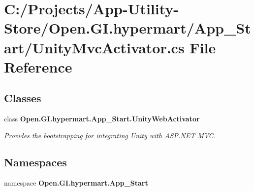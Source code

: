 \section{C\+:/\+Projects/\+App-\/\+Utility-\/\+Store/\+Open.G\+I.\+hypermart/\+App\+\_\+\+Start/\+Unity\+Mvc\+Activator.cs File Reference}
\label{_unity_mvc_activator_8cs}
\subsection*{Classes}
\begin{DoxyCompactItemize}
\item 
class {\bfseries Open.\+G\+I.\+hypermart.\+App\+\_\+\+Start.\+Unity\+Web\+Activator}
\begin{DoxyCompactList}\small\item\em Provides the bootstrapping for integrating Unity with A\+S\+P.\+N\+ET M\+VC.\end{DoxyCompactList}\end{DoxyCompactItemize}
\subsection*{Namespaces}
\begin{DoxyCompactItemize}
\item 
namespace \textbf{ Open.\+G\+I.\+hypermart.\+App\+\_\+\+Start}
\end{DoxyCompactItemize}
